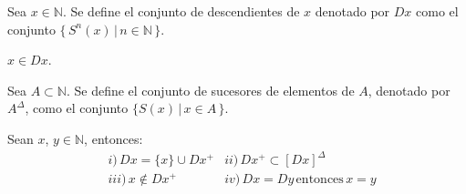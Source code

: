 \begin{definition}
    Sea $x \in \mathbb{N}$. Se define el conjunto de descendientes de $x$
    denotado por $Dx$ como el conjunto $\{ \, S^n (x) \, | \, n \in
    \mathbb{N}\,\}$.

    \begin{remark} $x\in Dx$.
    \end{remark}
\end{definition}
\begin{definition} Sea $A \subset \mathbb{N}$. Se define el conjunto de
    sucesores de elementos de $A$, denotado por $A^{\Delta}$, como el conjunto
    $\{S(x) \, | \, x \in A \, \}$.
\end{definition}
\begin{proposition}
    \label{prop:21}
    Sean $x$, $y \in \mathbb{N}$, entonces: 
    \begin{align*}
        &i)\, Dx = \{x\} \cup Dx^+ 
        &ii)\,Dx^+ \subset [Dx]^{\Delta}\\
        &iii)\,x \notin Dx^+  &iv)\,Dx = Dy \, \mathrm{entonces} \, x=y \\
    \end{align*}
\end{proposition}
